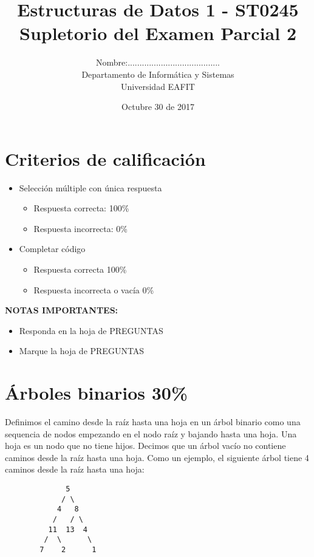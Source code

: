 \documentclass[twocolumn]{article}
\author{
Nombre:....................................... \\
    Departamento de Informática y Sistemas \\
    Universidad EAFIT \\
}
\title{
    Estructuras de Datos 1 - ST0245 \\
    Supletorio del Examen Parcial 2
}
\date{
    Octubre 30 de 2017
}
\begin{document}
\vspace{-5cm}
\maketitle


\section*{Criterios de calificación}

{\small
\begin{itemize}
\item Selección múltiple con única respuesta
\begin{itemize}
\item Respuesta correcta: 100\%
\item Respuesta incorrecta: 0\%
\end{itemize}

\item Completar código
\begin{itemize}
\item Respuesta correcta 100\%
\item Respuesta incorrecta o vacía 0\%\\
\end{itemize}
\end{itemize}


\textbf{NOTAS IMPORTANTES:}
\begin{itemize}
	\item Responda en la hoja de PREGUNTAS
	\item Marque la hoja de PREGUNTAS
\end{itemize}
}


\section{Árboles binarios 30\%}
Definimos el camino desde la raíz hasta una hoja en un árbol binario como una sequencia de nodos empezando
en el nodo raíz y bajando hasta una hoja. Una hoja es un nodo que no tiene hijos. Decimos que un árbol vacío no contiene
caminos desde la raíz hasta una hoja. Como un ejemplo, el siguiente árbol tiene 4 caminos desde la raíz hasta una hoja:
{\small
\begin{verbatim}
              5
             / \
            4   8
           /   / \
          11  13  4
         /  \      \
        7    2      1
\end{verbatim}
}
\end{document}
